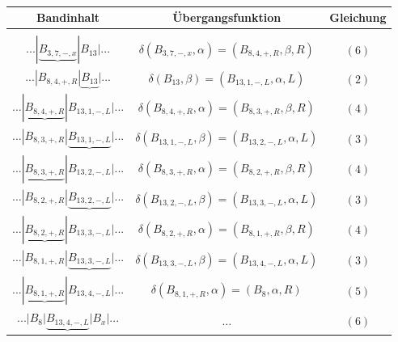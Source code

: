 \documentclass[10pt, a4paper]{article}
\begin{document}
\paragraph{}
\begin{tabular}{c||c c}
	\textbf{Bandinhalt} & \textbf{Übergangsfunktion} & \textbf{Gleichung}\\ \hline
	\\
	$...|\underbrace{B_{3,7,-,x}}|B_{13}|...$ &
	$\delta(B_{3,7,-,x},\alpha) = (B_{8,4,+,R},\beta,R)$ &  $(6)$\\ 
	\hline
	$...|B_{8,4,+,R}|\underbrace{B_{13}}|...$ & $\delta(B_{13},\beta) = (B_{13,1,-,L},\alpha,L)$ & $(2)$\\
	\hline
	$...|\underbrace{B_{8,4,+,R}}|B_{13,1,-,L}|...$ & $\delta(B_{8,4,+,R},\alpha) = (B_{8,3,+,R},\beta,R)$ & $(4)$\\
	\hline
	$...|B_{8,3,+,R}|\underbrace{B_{13,1,-,L}}|...$ &$\delta(B_{13,1,-,L},\beta) = (B_{13,2,-,L},\alpha,L)$  & $(3)$\\
	\hline
	$...|\underbrace{B_{8,3,+,R}}|B_{13,2,-,L}|...$ & $\delta(B_{8,3,+,R},\alpha) = (B_{8,2,+,R},\beta,R)$ & $(4)$\\
	\hline
	$...|B_{8,2,+,R}|\underbrace{B_{13,2,-,L}}|...$ & $\delta(B_{13,2,-,L},\beta) = (B_{13,3,-,L},\alpha,L)$ & $(3)$\\
	\hline
	$...|\underbrace{B_{8,2,+,R}}|B_{13,3,-,L}|...$ & $\delta(B_{8,2,+,R},\alpha) = (B_{8,1,+,R},\beta,R)$ & $(4)$\\
	\hline
	$...|B_{8,1,+,R}|\underbrace{B_{13,3,-,L}}|...$ & $\delta(B_{13,3,-,L},\beta) = (B_{13,4,-,L},\alpha,L)$ & $(3)$\\
	\hline
	$...|\underbrace{B_{8,1,+,R}}|B_{13,4,-,L}|...$ & $\delta(B_{8,1,+,R},\alpha) = (B_{8},\alpha,R)$ & $(5)$\\
	\hline
	$...|B_{8}|\underbrace{B_{13,4,-,L}}|B_{x}|...$ & $\dots$ & $(6)$\\
	\end{tabular}
	\par


\end{document}
